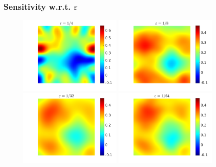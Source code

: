 \begin{frame}
\frametitle{Sensitivity w.r.t. $\varepsilon$}
\begin{figure}[t]
\centering
\includegraphics[width = 0.45\textwidth]{Images/ensemble_500_e4}
\includegraphics[width = 0.45\textwidth]{Images/ensemble_500_e8}
\\
\includegraphics[width = 0.45\textwidth]{Images/ensemble_500_e32}
\includegraphics[width = 0.45\textwidth]{Images/ensemble_500_e64}
\end{figure}
\end{frame}

